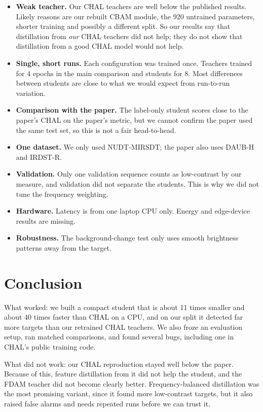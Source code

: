 \documentclass[11pt,a4paper]{article}
\begin{document}
\begin{itemize}
  \item \textbf{Weak teacher.} Our CHAL teachers are well below the published results. Likely reasons are our
        rebuilt CBAM module, the 920 untrained parameters, shorter training and possibly a different split. So
        our results say that distillation from \emph{our} CHAL teachers did not help; they do not show that
        distillation from a good CHAL model would not help.
  \item \textbf{Single, short runs.} Each configuration was trained once. Teachers trained for 4 epochs in the
        main comparison and students for 8. Most differences between students are close to what we would expect
        from run-to-run variation.
  \item \textbf{Comparison with the paper.} The label-only student scores close to the paper's CHAL on the paper's
        metric, but we cannot confirm the paper used the same test set, so this is not a fair head-to-head.
  \item \textbf{One dataset.} We only used NUDT-MIRSDT; the paper also uses DAUB-H and IRDST-R.
  \item \textbf{Validation.} Only one validation sequence counts as low-contrast by our measure, and validation
        did not separate the students. This is why we did not tune the frequency weighting.
  \item \textbf{Hardware.} Latency is from one laptop CPU only. Energy and edge-device results are missing.
  \item \textbf{Robustness.} The background-change test only uses smooth brightness patterns away from the target.
\end{itemize}

\section{Conclusion}

What worked: we built a compact student that is about 11 times smaller and about 40 times faster than CHAL on a
CPU, and on our split it detected far more targets than our retrained CHAL teachers. We also froze an evaluation
setup, ran matched comparisons, and found several bugs, including one in CHAL's public training code.

What did not work: our CHAL reproduction stayed well below the paper. Because of this, feature distillation from
it did not help the student, and the FDAM teacher did not become clearly better. Frequency-balanced distillation
was the most promising variant, since it found more low-contrast targets, but it also raised false alarms and
needs repeated runs before we can trust it.
\end{document}
